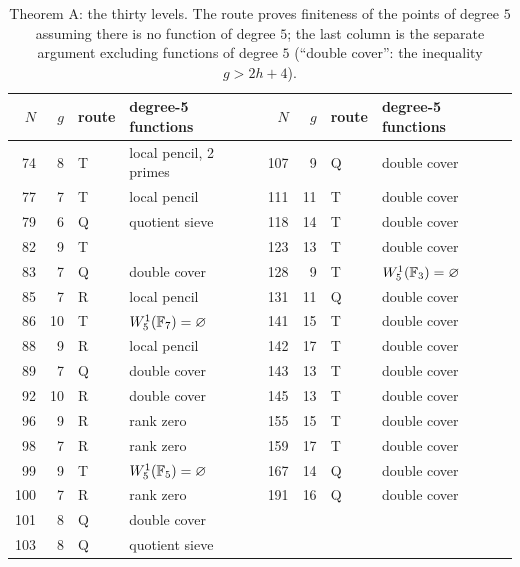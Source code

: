 \begin{table}[ht]\centering\small
\caption{Theorem A: the thirty levels. The route proves finiteness of the points of degree $5$ assuming there is
no function of degree $5$; the last column is the separate argument excluding functions of degree $5$ (``double
cover'': the inequality $g>2h+4$).}\label{tab:A}
\begin{tabular}{rrll@{\qquad}rrll}\toprule
$N$&$g$&route&degree-5 functions&$N$&$g$&route&degree-5 functions\\\midrule
74&8&T&local pencil, 2 primes&107&9&Q&double cover\\
77&7&T&local pencil&111&11&T&double cover\\
79&6&Q&quotient sieve&118&14&T&double cover\\
82&9&T&\cite{NajmanOrlic2024}&123&13&T&double cover\\
83&7&Q&double cover&128&9&T&$W^1_5(\mathbb{F}_3)=\varnothing$\\
85&7&R&local pencil&131&11&Q&double cover\\
86&10&T&$W^1_5(\mathbb{F}_7)=\varnothing$&141&15&T&double cover\\
88&9&R&local pencil&142&17&T&double cover\\
89&7&Q&double cover&143&13&T&double cover\\
92&10&R&double cover&145&13&T&double cover\\
96&9&R&rank zero&155&15&T&double cover\\
98&7&R&rank zero&159&17&T&double cover\\
99&9&T&$W^1_5(\mathbb{F}_5)=\varnothing$&167&14&Q&double cover\\
100&7&R&rank zero&191&16&Q&double cover\\
101&8&Q&double cover&&&&\\
103&8&Q&quotient sieve&&&&\\\bottomrule
\end{tabular}
\end{table}
